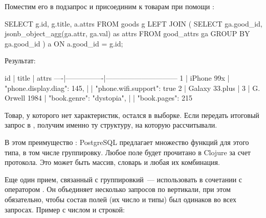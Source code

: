 Поместим его в подзапрос и присоединим к товарам при помощи :

\begin{english}
  \begin{sql}
SELECT
  g.id,
  g.title,
  a.attrs
FROM
  goods g
LEFT JOIN (
  SELECT
    ga.good_id,
    jsonb_object_agg(ga.attr, ga.val) as attrs
  FROM good_attrs ga
    GROUP BY ga.good_id
) a ON a.good_id = g.id;
  \end{sql}
\end{english}

Результат:


\begin{english}
  \begin{text}
 id |     title      |             attrs
----|----------------|------------------------------
  1 | iPhone 99x     | {"phone.display.diag": 145,
    |                |  "phone.wifi.support": true}
  2 | Galaxy 33.plus |
  3 | G. Orwell 1984 | {"book.genre": "dystopia",
    |                |  "book.pages": 215}
  \end{text}
\end{english}

Товар, у которого нет характеристик, остался в выборке. Если передать итоговый запрос в , получим именно ту структуру, на которую рассчитывали.

В этом преимущество : PostgreSQL предлагает множество функций для этого типа, в том числе группировку. Любое поле  будет прочитано в Clojure за счет протокола. Это может быть массив, словарь и любая их комбинация.

Еще один прием, связанный с группировкий~--- использовать  в сочетании с оператором . Он объединяет несколько запросов по вертикали, при этом обязательно, чтобы состав полей (их число и типы) был одинаков во всех запросах. Пример с числом и строкой:

